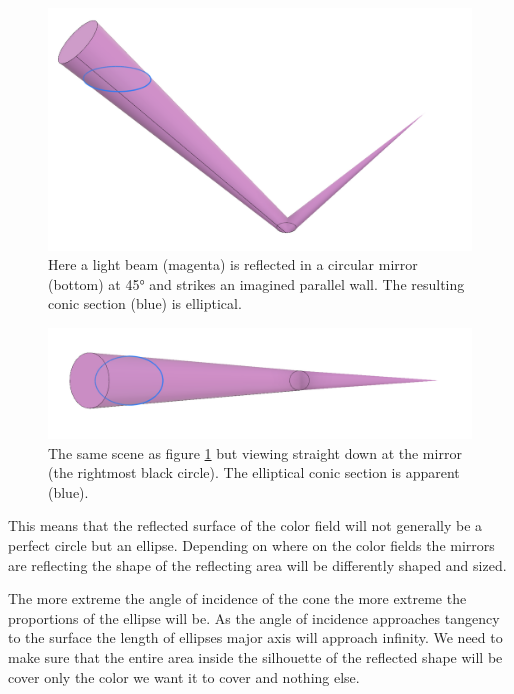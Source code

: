 \documentclass{article}
\begin{document}
\begin{figure}[ht!]
\centering
\includegraphics[width=\textwidth]{images/conic-section-1.png}
\caption{Here a light beam (magenta) is reflected in a circular mirror (bottom) at 45° and strikes an imagined parallel wall. The resulting conic section (blue) is elliptical.}
\label{fig:conic_section}
\end{figure}


\begin{figure}[ht!]
\centering
\includegraphics[width=\textwidth]{images/conic-section-2.png}
\caption{The same scene as figure \ref{fig:conic_section} but viewing straight down at the mirror (the rightmost black circle). The elliptical conic section is apparent (blue).}
\end{figure}


This means that the reflected surface of the color field will not
generally be a perfect circle but an ellipse. Depending on where on the
color fields the mirrors are reflecting the shape of the reflecting
area will be differently shaped and sized.

The more extreme the angle of incidence of the cone the more extreme the
proportions of the ellipse will be. As the angle of incidence approaches
tangency to the surface the length of ellipses major axis will approach
infinity. We need to make sure that the entire area inside the
silhouette of the reflected shape will be cover only the color we want
it to cover and nothing else.
\end{document}
